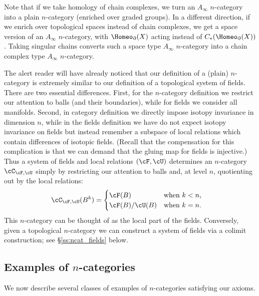 Note that if we take homology of chain complexes, we turn an $A_\infty$ $n$-category
into a plain $n$-category (enriched over graded groups).
In a different direction, if we enrich over topological spaces instead of chain complexes,
we get a space version of an $A_\infty$ $n$-category, with $\Homeo_\bd(X)$ acting 
instead of  $C_*(\Homeo_\bd(X))$.
Taking singular chains converts such a space type $A_\infty$ $n$-category into a chain complex
type $A_\infty$ $n$-category.

\medskip

The alert reader will have already noticed that our definition of a (plain) $n$-category
is extremely similar to our definition of a topological system of fields.
There are two essential differences.
First, for the $n$-category definition we restrict our attention to balls
(and their boundaries), while for fields we consider all manifolds.
Second,  in category definition we directly impose isotopy
invariance in dimension $n$, while in the fields definition we have do not expect isotopy invariance on fields
but instead remember a subspace of local relations which contain differences of isotopic fields. 
(Recall that the compensation for this complication is that we can demand that the gluing map for fields is injective.)
Thus a system of fields and local relations $(\cF,\cU)$ determines an $n$-category $\cC_ {\cF,\cU}$ simply by restricting our attention to
balls and, at level $n$, quotienting out by the local relations:
\begin{align*}
\cC_{\cF,\cU}(B^k) & = \begin{cases}\cF(B) & \text{when $k<n$,} \\ \cF(B) / \cU(B) & \text{when $k=n$.}\end{cases}
\end{align*}
This $n$-category can be thought of as the local part of the fields.
Conversely, given a topological $n$-category we can construct a system of fields via 
a colimit construction; see \S \ref{ss:ncat_fields} below.

\subsection{Examples of $n$-categories}
\label{ss:ncat-examples}


We now describe several classes of examples of $n$-categories satisfying our axioms.

